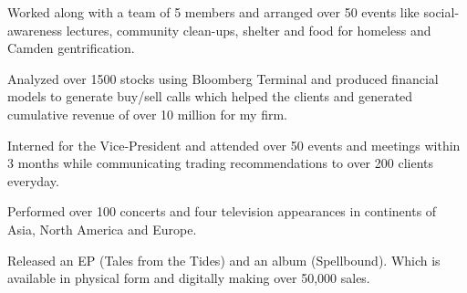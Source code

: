 \documentclass[]{deedy-resume-openfont}
\begin{document}
\begin{minipage}[t]{0.66\textwidth}
\begin{tightemize}
\item Worked along with a team of 5 members and arranged over 50 events like social-awareness lectures, community clean-ups, shelter and food for homeless and Camden gentrification.\end{tightemize}
\sectionsep

\begin{tightemize}
\item Analyzed over 1500 stocks using Bloomberg Terminal and produced financial models to generate buy/sell calls which helped the clients and generated cumulative revenue of over 10 million for my firm.\end{tightemize}
\sectionsep

\begin{tightemize}
\item Interned for the Vice-President and attended over 50 events and meetings within 3 months while communicating trading recommendations to over 200 clients everyday.
\end{tightemize}
\sectionsep


\begin{tightemize}
\item Performed over 100 concerts and four television appearances in continents of Asia, North America and Europe.\item Released an EP (Tales from the Tides) and an album (Spellbound). Which is available in physical form and digitally making over 50,000 sales.
\end{tightemize}
\sectionsep




\end{minipage} 
\end{document}
